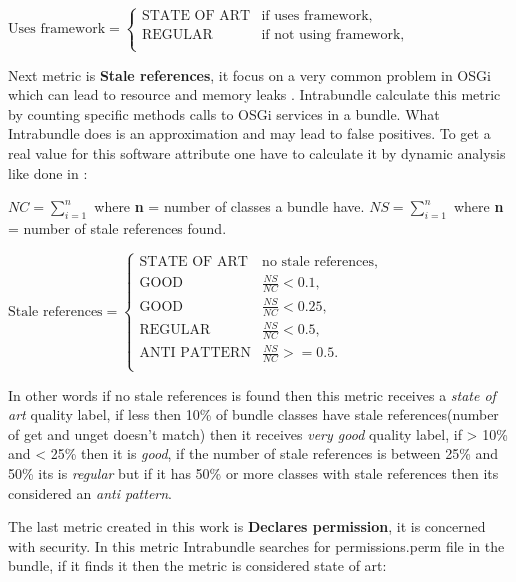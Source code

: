 \(\text{Uses framework}=\begin{cases}
\text{STATE OF ART}& \text{if uses framework},\\
\text{REGULAR}& \text{if not using framework}, \\
\end{cases} \)  \newline

Next metric is \textbf{Stale references}, it focus on a very common problem in OSGi which can lead to resource and memory leaks \citep{Gama 2011}. Intrabundle calculate this metric by counting specific methods calls to OSGi services in a bundle. What Intrabundle does is an approximation and may lead to false positives. To get a real value for this software attribute one have to calculate it by dynamic analysis like done in \citep{Gama 2012}:\newline

\(NC = \sum_{i=1}^{n} \) where \textbf{n} = number of classes a bundle have. \newline
\(NS = \sum_{i=1}^{n} \) where \textbf{n} = number of stale references found. \newline

\(\text{Stale references}=\begin{cases}
\text{STATE OF ART}& \text{no stale references},\\
\text{GOOD}& \frac{NS}{NC} < 0.1, \\
\text{GOOD}& \frac{NS}{NC} < 0.25, \\
\text{REGULAR}& \frac{NS}{NC} < 0.5, \\
\text{ANTI PATTERN}& \frac{NS}{NC} >= 0.5. \\
\end{cases} \)\newline     

In other words if no stale references is found then this metric receives a \emph{state of art} quality label, if less then 10\% of bundle classes have stale references(number of get and unget doesn't match) then it receives \emph{very good} quality label, if > 10\% and < 25\% then it is \emph{good}, if the number of stale references is between 25\% and 50\% its is \emph{regular} but if it has 50\% or more classes with stale references then its considered an \emph{anti pattern}. 

The last metric created in this work is \textbf{Declares permission}, it is concerned with security. In this metric Intrabundle searches for permissions.perm file in the bundle, if it finds it then the metric is considered state of art: \newline


